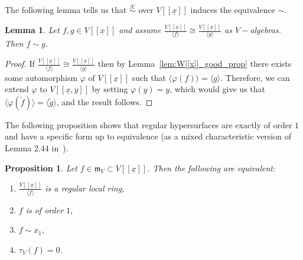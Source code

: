 \documentclass{article}
\newtheorem{lemma}[theorem]{Lemma}
\newtheorem{proposition}[theorem]{Proposition}
\newcommand{\equivk}{\overset{\mathcal{K}}{\sim}}
\newcommand{\maxV}{\mathfrak{m}_V}
\newcommand{\Vx}{V[[\underline{x}]]}
\newcommand{\Vxy}{V[[\underline{x},y]]}
\numberwithin{theorem}{section}
\begin{document}
The following lemma tells us that $\equivk$ over $V[[\underline{x}]]$ induces the equivalence $\sim$. 

\begin{lemma}\label{lemma:equiv_iso}
    Let $f,g \in \Vx$ and assume $\frac{\Vx}{ \langle f \rangle} \cong \frac{\Vx}{ \langle g \rangle}$ as $V-$algebras. Then $f \sim g$.
\end{lemma}

\begin{proof}
    If $\frac{\Vx}{ \langle f \rangle} \cong \frac{\Vx}{ \langle g \rangle}$ then by Lemma~\ref{lem:W[[x]]_good_prop} there exists some automorphism $\varphi$ of $\Vx$ such that $\langle \varphi\left(f\right) \rangle = \langle g \rangle$. Therefore, we can extend $\varphi$ to $\Vxy$ by setting $\varphi\left(y\right)=y$, which would give us that $\langle \varphi(\tilde{f}) \rangle = \langle \tilde{g} \rangle$, and the result follows. 
\end{proof}


The following proposition shows that regular hypersurfaces are exactly of order $1$ and have a specific form up to equivalence (as a mixed characteristic version of Lemma 2.44 in~\cite{greuel2007introduction}). 


\begin{proposition}\label{prop:milnor_zero}
    Let $f \in \maxV \subset \Vx$. Then the following are equivalent:
    \begin{enumerate}
        \item $\frac{\Vx}{\langle f \rangle}$ is a regular local ring, 
        \item $f$ is of order $1$, 
        \item $f \sim x_1$,
        \item $\tau_V\left(f\right)=0$.
    \end{enumerate}
\end{proposition}
\end{document}
